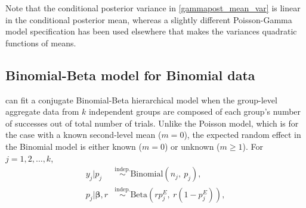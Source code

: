 \documentclass[article]{jss}
\begin{document}
Note that the conditional posterior variance in  \eqref{gammapost_mean_var} is linear in the conditional posterior mean, whereas a slightly different Poisson-Gamma model specification has been used elsewhere \citep{morris1997} that makes the variances  quadratic functions of means.  


\subsection[Binomial-Beta]{Binomial-Beta model for Binomial data}
 can fit a conjugate Binomial-Beta hierarchical model when the group-level aggregate data from $k$ independent  groups are composed of each group's number of successes out of total number of trials. Unlike the Poisson model, which is for the case with a known second-level mean ($m=0$), the expected random effect in the Binomial model is either known ($m=0$) or unknown ($m\ge1$). For $j=1, 2, \ldots, k$,
\begin{align}
y_{j} \vert p_{j} &\stackrel{\textrm{indep.}}{\sim} \textrm{Binomial}(n_{j}, ~p_{j}),\\
p_{j} \vert \boldsymbol{\beta}, r &\stackrel{\textrm{indep.}}{\sim} \textrm{Beta}(rp^E_j,~ r(1-p^E_j)),
\end{align}
\end{document}
